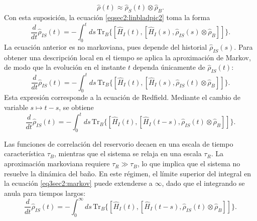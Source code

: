 \begin{equation*}
    \hat{\rho}(t) \approx \hat{\rho}_{S}(t)\otimes \hat{\rho}_{B}.
\end{equation*}
Con esta suposición, la ecuación \eqref{eqsec2:linbladpic2} toma la forma
\begin{equation}
    \frac{d}{dt}\hat{\rho}_{IS}(t) = - \int_{0}^{t} ds \,\text{Tr}_{B}\{[\hat{H}_{I}(t), [\hat{H}_{I}(s), \hat{\rho}_{IS}(s) \otimes \hat{\rho}_{B}]]\}.
\end{equation}
La ecuación anterior es no markoviana, pues depende del historial $\hat{\rho}_{IS}(s)$. Para obtener una descripción local en el tiempo se aplica la aproximación de Markov, de modo que la evolución en el instante $t$ dependa únicamente de $\hat{\rho}_{IS}(t)$:
\begin{equation*}
    \frac{d}{dt}\hat{\rho}_{IS}(t) = - \int_{0}^{t} ds \,\text{Tr}_{B}\{[\hat{H}_{I}(t), [\hat{H}_{I}(s), \hat{\rho}_{IS}(t) \otimes \hat{\rho}_{B}]]\}.
\end{equation*}
Esta expresión corresponde a la ecuación de Redfield. Mediante el cambio de variable $s \mapsto t-s$, se obtiene
\begin{equation}
    \frac{d}{dt}\hat{\rho}_{IS}(t) = - \int_{0}^{t} ds \,\text{Tr}_{B}\{[\hat{H}_{I}(t), [\hat{H}_{I}(t-s), \hat{\rho}_{IS}(t) \otimes \hat{\rho}_{B}]]\}.
    \label{eq3sec2:markov}
\end{equation}

Las funciones de correlación del reservorio decaen en una escala de tiempo característica $\tau_{B}$, mientras que el sistema se relaja en una escala $\tau_{R}$. La aproximación markoviana requiere $\tau_{R}\gg \tau_{B}$, lo que implica que el sistema no resuelve la dinámica del baño. En este régimen, el límite superior del integral en la ecuación \eqref{eq3sec2:markov} puede extenderse a $\infty$, dado que el integrando se anula para tiempos largos:
\begin{equation}
    \frac{d}{dt}\hat{\rho}_{IS}(t) = - \int_{0}^{\infty} ds \,\text{Tr}_{B}\{[\hat{H}_{I}(t), [\hat{H}_{I}(t-s), \hat{\rho}_{IS}(t) \otimes \hat{\rho}_{B}]]\}.
    \label{eq3sec2:markov1}
\end{equation}

